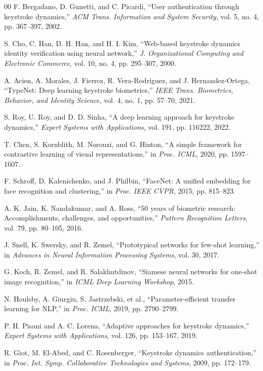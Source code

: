 \documentclass{ieeeaccess}
\begin{document}
{\begin{thebibliography}{00}
 F. Bergadano, D. Gunetti, and C. Picardi, ``User authentication through keystroke dynamics,'' \emph{ACM Trans. Information and System Security}, vol. 5, no. 4, pp. 367--397, 2002.

 S. Cho, C. Han, D. H. Han, and H. I. Kim, ``Web-based keystroke dynamics identity verification using neural network,'' \emph{J. Organizational Computing and Electronic Commerce}, vol. 10, no. 4, pp. 295--307, 2000.

 A. Acien, A. Morales, J. Fierrez, R. Vera-Rodriguez, and J. Hernandez-Ortega, ``TypeNet: Deep learning keystroke biometrics,'' \emph{IEEE Trans. Biometrics, Behavior, and Identity Science}, vol. 4, no. 1, pp. 57--70, 2021.

 S. Roy, U. Roy, and D. D. Sinha, ``A deep learning approach for keystroke dynamics,'' \emph{Expert Systems with Applications}, vol. 191, pp. 116222, 2022.

 T. Chen, S. Kornblith, M. Norouzi, and G. Hinton, ``A simple framework for contrastive learning of visual representations,'' in \emph{Proc. ICML}, 2020, pp. 1597--1607.

 F. Schroff, D. Kalenichenko, and J. Philbin, ``FaceNet: A unified embedding for face recognition and clustering,'' in \emph{Proc. IEEE CVPR}, 2015, pp. 815--823.

 A. K. Jain, K. Nandakumar, and A. Ross, ``50 years of biometric research: Accomplishments, challenges, and opportunities,'' \emph{Pattern Recognition Letters}, vol. 79, pp. 80--105, 2016.

 J. Snell, K. Swersky, and R. Zemel, ``Prototypical networks for few-shot learning,'' in \emph{Advances in Neural Information Processing Systems}, vol. 30, 2017.

 G. Koch, R. Zemel, and R. Salakhutdinov, ``Siamese neural networks for one-shot image recognition,'' in \emph{ICML Deep Learning Workshop}, 2015.

 N. Houlsby, A. Giurgiu, S. Jastrzebski, et al., ``Parameter-efficient transfer learning for NLP,'' in \emph{Proc. ICML}, 2019, pp. 2790--2799.

 P. H. Pisani and A. C. Lorena, ``Adaptive approaches for keystroke dynamics,'' \emph{Expert Systems with Applications}, vol. 126, pp. 153--167, 2019.

 R. Giot, M. El-Abed, and C. Rosenberger, ``Keystroke dynamics authentication,'' in \emph{Proc. Int. Symp. Collaborative Technologies and Systems}, 2009, pp. 172--179.


\end{thebibliography}}
\end{document}

